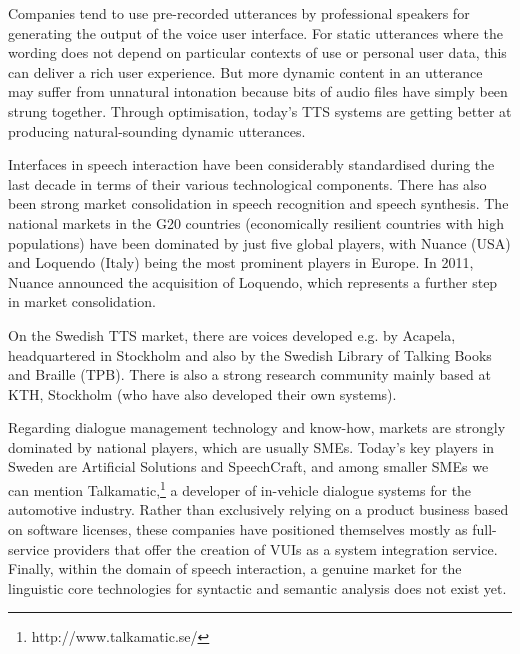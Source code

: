 \begin{multicols}{2}
Companies tend to use pre-recorded utterances by professional speakers for generating the output of the voice user interface. For static utterances where the wording does not depend on particular contexts of use or personal user data, this can deliver a rich user experience. But more dynamic content in an utterance may suffer from unnatural intonation because bits of audio files have simply been strung together. Through optimisation, today’s TTS systems are getting better at producing natural-sounding dynamic utterances.


Interfaces in speech interaction have been considerably standardised during the last decade in terms of their various technological components. There has also been strong market consolidation in speech recognition and speech synthesis. The national markets in the G20 countries (economically resilient countries with high populations) have been dominated by just five global players, with Nuance (USA) and Loquendo (Italy) being the most prominent players in Europe. In 2011, Nuance announced the acquisition of Loquendo, which represents a further step in market consolidation.

On the Swedish TTS market, there are voices developed e.g. by Acapela, headquartered in Stockholm and also by the Swedish Library of Talking Books and Braille (TPB). There is also a strong research community mainly based at KTH, Stockholm (who have also developed their own systems).

Regarding dialogue management technology and know-how, markets are
strongly dominated by national players, which are usually
SMEs. Today’s key players in Sweden are Artificial Solutions and
SpeechCraft, and among smaller SMEs we can mention
Talkamatic,\footnote{http://www.talkamatic.se/} a developer of
in-vehicle dialogue systems for the automotive industry. Rather than
exclusively relying on a product business based on software licenses,
these companies have positioned themselves mostly as full-service
providers that offer the creation of VUIs as a system integration
service. Finally, within the domain of speech interaction, a genuine
market for the linguistic core technologies for syntactic and semantic
analysis does not exist yet.


\end{multicols}
